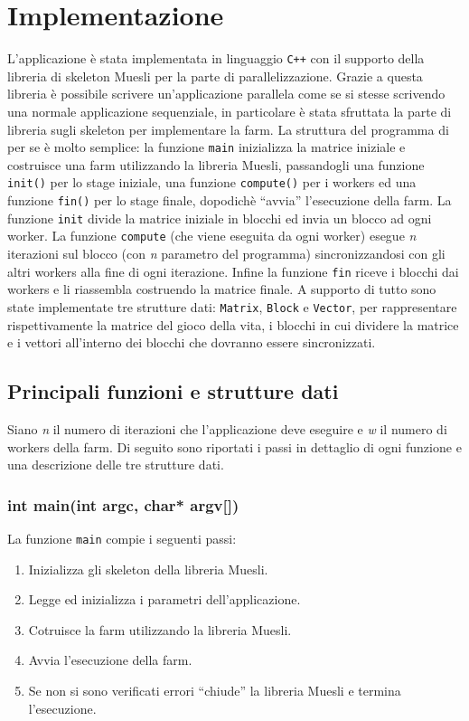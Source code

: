 \section{Implementazione}
\label{sec:implementation}
L'applicazione \`e stata implementata in linguaggio \texttt{C++} con il supporto della libreria di skeleton Muesli \cite{bib:ref3} per la parte di parallelizzazione. Grazie a questa libreria \`e possibile scrivere un'applicazione parallela come se si stesse scrivendo una normale applicazione sequenziale, in particolare \`e stata sfruttata la parte di libreria sugli skeleton per implementare la farm. La struttura del programma di per se \`e molto semplice: la funzione \texttt{main} inizializza la matrice iniziale e costruisce una farm utilizzando la libreria Muesli, passandogli una funzione \texttt{init()} per lo stage iniziale, una funzione \texttt{compute()} per i workers ed una funzione \texttt{fin()} per lo stage finale, dopodich\`e ``avvia'' l'esecuzione della farm. La funzione \texttt{init} divide la matrice iniziale in blocchi ed invia un blocco ad ogni worker. La funzione \texttt{compute} (che viene eseguita da ogni worker) esegue \textit{n} iterazioni sul blocco (con \textit{n} parametro del programma) sincronizzandosi con gli altri workers alla fine di ogni iterazione. Infine la funzione \texttt{fin} riceve i blocchi dai workers e li riassembla costruendo la matrice finale. A supporto di tutto sono state implementate tre strutture dati: \texttt{Matrix}, \texttt{Block} e \texttt{Vector}, per rappresentare rispettivamente la matrice del gioco della vita, i blocchi in cui dividere la matrice e i vettori all'interno dei blocchi che dovranno essere sincronizzati.

\subsection{Principali funzioni e strutture dati}
Siano \textit{n} il numero di iterazioni che l'applicazione deve eseguire e \textit{w} il numero di workers della farm. Di seguito sono riportati i passi in dettaglio di ogni funzione e una descrizione delle tre strutture dati.

\subsubsection*{int main(int argc, char* argv[])}
La funzione \texttt{main} compie i seguenti passi:
\begin{enumerate}
  \item Inizializza gli skeleton della libreria Muesli.
  \item Legge ed inizializza i parametri dell'applicazione.
  \item Cotruisce la farm utilizzando la libreria Muesli.
  \item Avvia l'esecuzione della farm.
  \item Se non si sono verificati errori ``chiude'' la libreria Muesli e termina l'esecuzione.
\end{enumerate}

